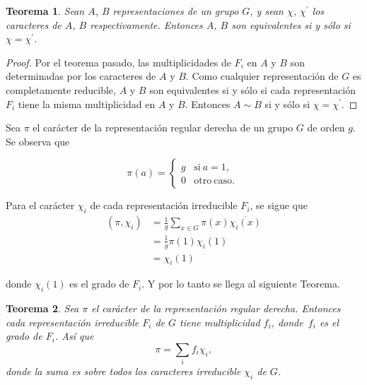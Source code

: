 \documentclass[12pt]{book}
\newtheorem{theorem}{Teorema}[section]
\theoremstyle{definition}
\newcounter{in}
\begin{document}
\begin{theorem}
  \label{t4_6}
  Sean $A$, $B$ representaciones de un grupo $G$, y sean $\chi$,
  $\chi^{'}$ los caracteres de $A$, $B$ respectivamente. Entonces $A$,
  $B$ son equivalentes si y sólo si $\chi=\chi^{'}$.
\end{theorem}

\begin{proof}
  Por el teorema pasado, las multiplicidades de $F_{i}$ en $A$ y $B$
  son determinadas por los caracteres de $A$ y $B$. Como cualquier
  representación de $G$ es completamente reducible, $A$ y $B$ son
  equivalentes si y sólo si cada representación $F_{i}$ tiene la misma
  multiplicidad en $A$ y $B$. Entonces $A \sim B$ si y sólo si $\chi=\chi^{'}$.
\end{proof}

Sea $\pi$ el carácter de la representación regular derecha de un grupo
$G$ de orden $g$. Se observa que

\begin{equation}
  \label{eq:39}
   \pi(a) = \left\{
     \begin{array}{ll}
       g      & \mathrm{si\ } a = 1, \\
       0      & \mathrm{otro\ caso.\ } 
     \end{array}
   \right.
\end{equation}

Para el carácter $\chi_{i}$ de cada representación irreducible
$F_{i}$, se sigue que
\begin{equation}
  \label{eq:40}
  \begin{aligned}
    (\pi,\chi_{i}) & =\frac{1}{g} \sum_{x \in G} \pi(x) \overline{\chi_{i}(x)} \\
    &=\frac{1}{g} \pi(1) \chi_{i}(1) \\
    &=\chi_{i}(1) 
  \end{aligned}
\end{equation}

donde $\chi_{i}(1)$ es el grado de $F_{i}$. Y por lo tanto se llega al
siguiente Teorema.
\begin{theorem}
  \label{t4_7}
  Sea $\pi$ el carácter de la representación regular derecha. Entonces
  cada representación irreducible $F_{i}$ de $G$ tiene multiplicidad
  $f_{i}$, donde~$f_{i}$ es el grado de $F_{i}$. Así que
  \begin{equation*}
    \pi=\sum_{i} f_{i} \chi_{i},
  \end{equation*}
  donde la suma es sobre todos los caracteres irreducible $\chi_{i}$ de $G$.
\end{theorem}
\end{document}
